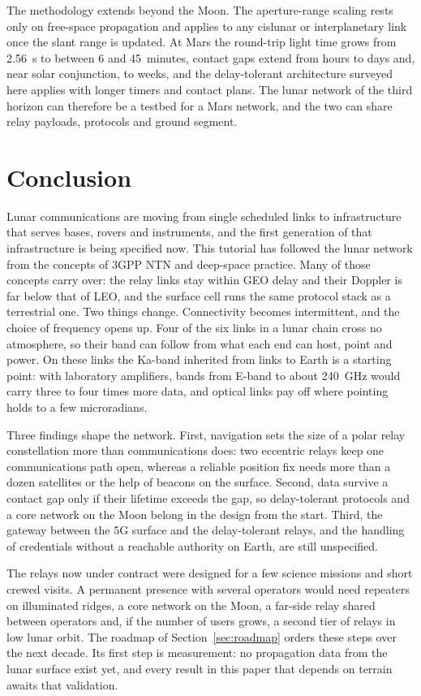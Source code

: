 \documentclass{IEEEoj}
\begin{document}
The methodology extends beyond the Moon. The aperture-range scaling rests only on free-space propagation and applies to any cislunar or interplanetary link once the slant range is updated. At Mars the round-trip light time grows from \SI{2.56}{\second} to between \SI{6}{} and \SI{45}{minutes}, contact gaps extend from hours to days and, near solar conjunction, to weeks, and the delay-tolerant architecture surveyed here applies with longer timers and contact plans. The lunar network of the third horizon can therefore be a testbed for a Mars network, and the two can share relay payloads, protocols and ground segment.

\section{Conclusion}
\label{sec:conclusion}
Lunar communications are moving from single scheduled links to infrastructure that serves bases, rovers and instruments, and the first generation of that infrastructure is being specified now. This tutorial has followed the lunar network from the concepts of 3GPP NTN and deep-space practice. Many of those concepts carry over: the relay links stay within GEO delay and their Doppler is far below that of LEO, and the surface cell runs the same protocol stack as a terrestrial one. Two things change. Connectivity becomes intermittent, and the choice of frequency opens up. Four of the six links in a lunar chain cross no atmosphere, so their band can follow from what each end can host, point and power. On these links the Ka-band inherited from links to Earth is a starting point: with laboratory amplifiers, bands from E-band to about \SI{240}{GHz} would carry three to four times more data, and optical links pay off where pointing holds to a few microradians.

Three findings shape the network. First, navigation sets the size of a polar relay constellation more than communications does: two eccentric relays keep one communications path open, whereas a reliable position fix needs more than a dozen satellites or the help of beacons on the surface. Second, data survive a contact gap only if their lifetime exceeds the gap, so delay-tolerant protocols and a core network on the Moon belong in the design from the start. Third, the gateway between the 5G surface and the delay-tolerant relays, and the handling of credentials without a reachable authority on Earth, are still unspecified.

The relays now under contract were designed for a few science missions and short crewed visits. A permanent presence with several operators would need repeaters on illuminated ridges, a core network on the Moon, a far-side relay shared between operators and, if the number of users grows, a second tier of relays in low lunar orbit. The roadmap of Section~\ref{sec:roadmap} orders these steps over the next decade. Its first step is measurement: no propagation data from the lunar surface exist yet, and every result in this paper that depends on terrain awaits that validation.
\end{document}
